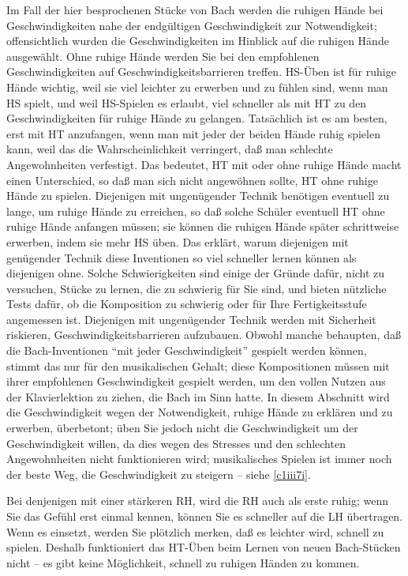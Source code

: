 Im Fall der hier besprochenen Stücke von Bach werden die ruhigen Hände bei Geschwindigkeiten nahe der endgültigen Geschwindigkeit zur Notwendigkeit; offensichtlich wurden die Geschwindigkeiten im Hinblick auf die ruhigen Hände ausgewählt.
Ohne ruhige Hände werden Sie bei den empfohlenen Geschwindigkeiten auf Geschwindigkeitsbarrieren treffen.
HS-Üben ist für ruhige Hände wichtig, weil sie viel leichter zu erwerben und zu fühlen sind, wenn man HS spielt, und weil HS-Spielen es erlaubt, viel schneller als mit HT zu den Geschwindigkeiten für ruhige Hände zu gelangen.
Tatsächlich ist es am besten, erst mit HT anzufangen, wenn man mit jeder der beiden Hände ruhig spielen kann, weil das die Wahrscheinlichkeit verringert, daß man schlechte Angewohnheiten verfestigt.
Das bedeutet, HT mit oder ohne ruhige Hände macht einen Unterschied, so daß man sich nicht angewöhnen sollte, HT ohne ruhige Hände zu spielen.
Diejenigen mit ungenügender Technik benötigen eventuell zu lange, um ruhige Hände zu erreichen, so daß solche Schüler eventuell HT ohne ruhige Hände anfangen müssen; sie können die ruhigen Hände später schrittweise erwerben, indem sie mehr HS üben.
Das erklärt, warum diejenigen mit genügender Technik diese Inventionen so viel schneller lernen können als diejenigen ohne.
Solche Schwierigkeiten sind einige der Gründe dafür, nicht zu versuchen, Stücke zu lernen, die zu schwierig für Sie sind, und bieten nützliche Tests dafür, ob die Komposition zu schwierig oder für Ihre Fertigkeitsstufe angemessen ist.
Diejenigen mit ungenügender Technik werden mit Sicherheit riskieren, Geschwindigkeitsbarrieren aufzubauen.
Obwohl manche behaupten, daß die Bach-Inventionen \enquote{mit jeder Geschwindigkeit} gespielt werden können, stimmt das nur für den musikalischen Gehalt; diese Kompositionen müssen mit ihrer empfohlenen Geschwindigkeit gespielt werden, um den vollen Nutzen aus der Klavierlektion zu ziehen, die Bach im Sinn hatte.
In diesem Abschnitt wird die Geschwindigkeit wegen der Notwendigkeit, ruhige Hände zu erklären und zu erwerben, überbetont;
üben Sie jedoch nicht die Geschwindigkeit um der Geschwindigkeit willen, da dies wegen des Stresses und den schlechten Angewohnheiten nicht funktionieren wird; musikalisches Spielen ist immer noch der beste Weg, die Geschwindigkeit zu steigern -- siehe \autoref{c1iii7i}.

Bei denjenigen mit einer stärkeren RH, wird die RH auch als erste ruhig; wenn Sie das Gefühl erst einmal kennen, können Sie es schneller auf die LH übertragen.
Wenn es einsetzt, werden Sie plötzlich merken, daß es leichter wird, schnell zu spielen.
Deshalb funktioniert das HT-Üben beim Lernen von neuen Bach-Stücken nicht -- es gibt keine Möglichkeit, schnell zu ruhigen Händen zu kommen.

